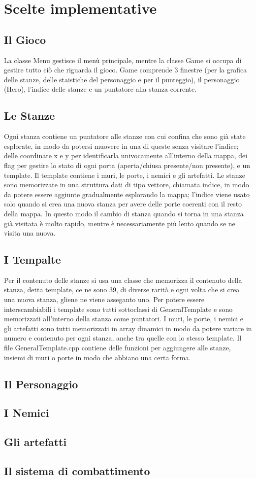 \documentclass[12pt]{article}
\begin{document}
\newpage
\section*{Scelte implementative}
\subsection*{Il Gioco}
La classe Menu gestisce il menù principale, mentre la classe Game si occupa di gestire tutto ciò che riguarda il gioco.
Game comprende 3 finestre (per la grafica delle stanze, delle staistiche del personaggio e per il punteggio), il personaggio (Hero), l'indice delle stanze e un puntatore alla stanza corrente.

\subsection*{Le Stanze}
Ogni stanza contiene un puntatore alle stanze con cui confina che sono già state esplorate, in modo da potersi muovere in una di queste senza visitare l'indice; delle coordinate x e y per identificarla univocamente all'interno della mappa, dei flag per gestire lo stato di ogni porta (aperta/chiusa presente/non presente), e un template. Il template contiene i muri, le porte, i nemici e gli artefatti.
Le stanze sono memorizzate in una struttura dati di tipo vettore, chiamata indice, in modo da potere essere aggiunte gradualmente esplorando la mappa; l'indice viene usato solo quando si crea una nuova stanza per avere delle porte coerenti con il resto della mappa.
In questo modo il cambio di stanza quando si torna in una stanza già visitata è molto rapido, mentre è necessariamente più lento quando se ne visita una nuova. 

\subsection*{I Tempalte}
Per il contenuto delle stanze si usa una classe che memorizza il contenuto della stanza, detta template, ce ne sono 39, di diverse rarità e ogni volta che si crea una nuova stanza, gliene ne viene asseganto uno.
Per potere essere interscambiabili i template sono tutti sottoclassi di GeneralTemplate e sono memorizzati all'interno della stanza come puntatori.
I muri, le porte, i nemici e gli artefatti sono tutti memorizzati in array dinamici in modo da potere variare in numero e contenuto per ogni stanza, anche tra quelle con lo stesso template.
Il file GeneralTemplate.cpp contiene delle funzioni per aggiungere alle stanze, insiemi di muri o porte in modo che abbiano una certa forma.

\subsection*{Il Personaggio}
\subsection*{I Nemici}
\subsection*{Gli artefatti}
\subsection*{Il sistema di combattimento}
\end{document}
